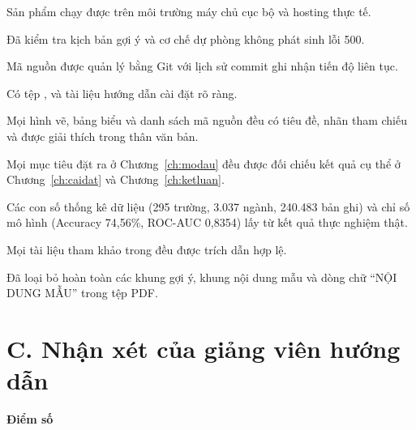 \begin{tukiem}
  \item Sản phẩm chạy được trên môi trường máy chủ cục bộ và hosting thực tế.
  \item Đã kiểm tra kịch bản gợi ý và cơ chế dự phòng không phát sinh lỗi 500.
  \item Mã nguồn được quản lý bằng Git với lịch sử commit ghi nhận tiến độ liên tục.
  \item Có tệp ,  và tài liệu hướng dẫn cài đặt rõ ràng.
  \item Mọi hình vẽ, bảng biểu và danh sách mã nguồn đều có tiêu đề, nhãn tham chiếu và được giải thích trong thân văn bản.
  \item Mọi mục tiêu đặt ra ở Chương~\ref{ch:modau} đều được đối chiếu kết quả cụ thể ở Chương~\ref{ch:caidat} và Chương~\ref{ch:ketluan}.
  \item Các con số thống kê dữ liệu (295 trường, 3.037 ngành, 240.483 bản ghi) và chỉ số mô hình (Accuracy 74,56\%, ROC-AUC 0,8354) lấy từ kết quả thực nghiệm thật.
  \item Mọi tài liệu tham khảo trong  đều được trích dẫn hợp lệ.
  \item Đã loại bỏ hoàn toàn các khung gợi ý, khung nội dung mẫu và dòng chữ ``NỘI DUNG MẪU'' trong tệp PDF.
\end{tukiem}

\section*{C. Nhận xét của giảng viên hướng dẫn}
{}

\khungnhanxet[7.5cm]

\vspace{0.8em}
\noindent\begin{minipage}[t]{0.5\textwidth}
\color{daunavy}
{\color{daumaroon}\bfseries Điểm số}

\vspace{0.7em}

\vspace{0.9em}
\end{minipage}\hfill
{}
